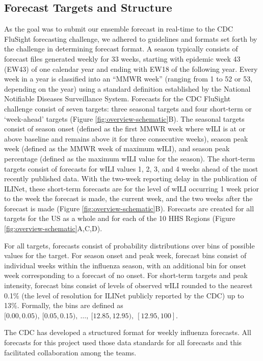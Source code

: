 \documentclass{article}\usepackage[]{graphicx}\usepackage[]{color}
\begin{document}
\subsection{Forecast Targets and Structure}
As the goal was to submit our ensemble forecast in real-time to the CDC FluSight forecasting challenge, we adhered to guidelines and formats set forth by the challenge in determining forecast format.
A season typically consists of forecast files generated weekly for 33 weeks, starting with epidemic week 43 (EW43) of one calendar year and ending with EW18 of the following year.
Every week in a year is classified into an ``MMWR week'' (ranging from 1 to 52 or 53, depending on the year) using a standard definition established by the National Notifiable Diseases Surveillance System.\cite{NewMexicoDepartmentofHealth,Niemi2015,Tushar2018}
Forecasts for the CDC FluSight challenge consist of seven targets: three seasonal targets and four short-term or `week-ahead' targets (Figure \ref{fig:overview-schematic}B). 
The seasonal targets consist of season onset (defined as the first MMWR week where wILI is at or above baseline and remains above it for three consecutive weeks), season peak week (defined as the MMWR week of maximum wILI), and season peak percentage (defined as the maximum wILI value for the season). The short-term targets consist of forecasts for wILI values 1, 2, 3, and 4 weeks ahead of the most recently published data. With the two-week reporting delay in the publication of ILINet, these short-term forecasts are for the level of wILI occurring 1 week prior to the week the forecast is made, the current week, and the two weeks after the forecast is made (Figure \ref{fig:overview-schematic}B). Forecasts are created for all targets for the US as a whole and for each of the 10 HHS Regions (Figure \ref{fig:overview-schematic}A,C,D).

For all targets, forecasts consist of probability distributions over bins of possible values for the target. For season onset and peak week, forecast bins consist of individual weeks within the influenza season, with an additional bin for onset week corresponding to a forecast of no onset. For short-term targets and peak intensity, forecast bins consist of levels of observed wILI rounded to the nearest 0.1\% (the level of resolution for ILINet publicly reported by the CDC) up to 13\%. Formally, the bins are defined as $[0.00, 0.05),\ [0.05, 0.15),\ \dots,\ [12.85, 12.95),\ [12.95, 100]$. 

The CDC has developed a structured format for weekly influenza forecasts. All forecasts for this project used those data standards for all forecasts and this facilitated collaboration among the teams.
\end{document}
